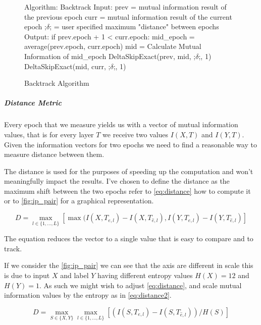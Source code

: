\documentclass[dissertation.tex]{subfiles}
\begin{document}
\begin{figure}[H]
    \begin{pythonfigure}
      Algorithm: Backtrack
      Input:
      prev = mutual information result of the previous epoch
      curr = mutual information result of the current epoch
      ;$\delta$; = user specified maximum "distance" between epochs
      Output:
      if prev.epoch + 1 < curr.epoch:
        mid_epoch = average(prev.epoch, curr.epoch)
        mid = Calculate Mutual Information of mid_epoch
        DeltaSkipExact(prev, mid, ;$\delta$;, 1)
        DeltaSkipExact(mid, curr, ;$\delta$;, 1)
    \end{pythonfigure}
    \caption{Backtrack Algorithm}
    \label{fig:backtrack}
\end{figure}


  \subparagraph{Distance Metric}
  Every epoch that we measure yields us with a vector of mutual information
  values, that is for every layer $T$ we receive two values $I(X,T)$ and
  $I(Y,T)$. Given the information vectors for two epochs we need to find a
  reasonable way to measure distance between them.

  The distance is used for the purposes of speeding up the computation and won't
  meaningfully impact the results. I've chosen to define the distance as the
  maximum shift between the two epochs refer to \autoref{eq:distance} how to
  compute it or to \autoref{fig:ip_pair} for a graphical representation.

  \begin{equation}
    D = \max_{l\in \{1,...,L\}} [\max(I(X, T_{e,l}) - I(X, T_{\hat{e}, l}), I(Y, T_{e,l}) - I(Y, T_{\hat{e}, l})]
    \label{eq:distance}
  \end{equation} 

  The equation reduces the vector to a single value that is easy to compare and
  to track.

  If we consider the \autoref{fig:ip_pair} we can see that the axis are
  different in scale this is due to input $X$ and label $Y$ having different
  entropy values $ H(X) = 12 $ and $ H(Y) = 1 $. As such we might wish to adjust
  \autoref{eq:distance}, and scale mutual information values by the entropy as
  in \autoref{eq:distance2}.

  \begin{equation}
    D = \max_{S\in\{X, Y\}} \max_{l\in \{1,...,L\}} [(I(S, T_{e,l}) - I(S, T_{\hat{e},l})) / H(S)]
    \label{eq:distance2}
  \end{equation} 
\end{document}
